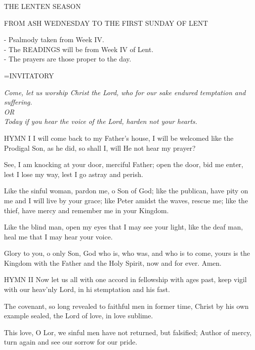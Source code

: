 \begin{center}\normalsize THE LENTEN SEASON\\
\begin{center}
\normalsize \footnotesize FROM ASH WEDNESDAY TO THE FIRST SUNDAY OF LENT\\
\end{center}
\footnotesize - Psalmody taken from Week IV.\\
\footnotesize - The READINGS will be from Week IV of Lent.\\
\footnotesize - The prayers are those proper to the day.\\
\end{center}

\hangindent=\parindent \small{INVITATORY}
\begin{center}
\textit{Come, let us worship Christ the Lord, who for our sake endured temptation and suffering.\\}
\textit{OR\\}
\textit{Today if you hear the voice of the Lord, harden not your hearts.\\}
\end{center}

HYMN I
I will come back to my Father's house,
I will be welcomed like the Prodigal Son,
as he did, so shall I,
will He not hear my prayer?

See, I am knocking at your door, merciful Father;
open the door, bid me enter,
lest I lose my way,
lest I go astray and perish.

Like the sinful woman, pardon me, o Son of God;
like the publican, have pity on me and I will live by your grace;
like Peter amidst the waves, rescue me;
like the thief, have mercy and remember me in your Kingdom.

Like the blind man, open my eyes
that I may see your light,
like the deaf man,  heal me
that I may hear your voice.

Glory to you, o only Son,
God who is, who was, and who is to come,
yours is the Kingdom with the Father and the Holy Spirit,
now and for ever. Amen.

HYMN II
Now let us all with one accord
in fellowship with ages past,
keep vigil with our heav'nly Lord,
in hi stemptation and his fast.

The covenant, so long revealed 
to faithful men in former time,
Christ by his own example sealed,
the Lord of love, in love sublime.

This love, O Lor, we sinful men
have not returned, but falsified;
Author of mercy, turn again
and see our sorrow for our pride.


